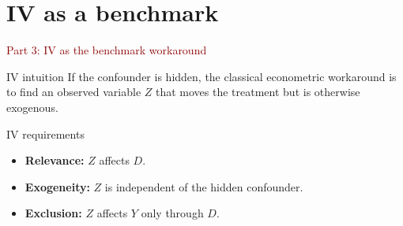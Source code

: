 \documentclass[dvipsnames,aspectratio=169,handout]{beamer}
\begin{document}

\section{IV as a benchmark}

\begin{frame}{}
\begin{center}
{\Huge \textcolor{DarkRed}{Part 3: IV as the benchmark workaround}}
\end{center}
\end{frame}

\begin{frame}{IV intuition}
If the confounder is hidden, the classical econometric workaround is to find an observed variable $Z$ that moves the treatment but is otherwise exogenous.

\begin{center}
\end{center}

\begin{block}{IV requirements}
\begin{itemize}
    \item \textbf{Relevance:} $Z$ affects $D$.
    \item \textbf{Exogeneity:} $Z$ is independent of the hidden confounder.
    \item \textbf{Exclusion:} $Z$ affects $Y$ only through $D$.
\end{itemize}
\end{block}
\end{frame}
\end{document}
